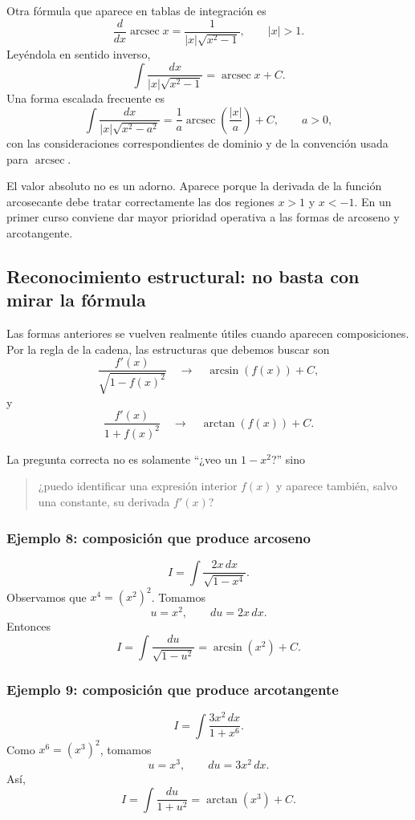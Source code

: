Otra fórmula que aparece en tablas de integración es
\[
\frac{d}{dx}\operatorname{arcsec}x
=\frac1{|x|\sqrt{x^2-1}},\qquad |x|>1.
\]
Leyéndola en sentido inverso,
\[
\boxed{\int\frac{dx}{|x|\sqrt{x^2-1}}
=\operatorname{arcsec}x+C.}
\]
Una forma escalada frecuente es
\[
\boxed{\int\frac{dx}{|x|\sqrt{x^2-a^2}}
=\frac1a\operatorname{arcsec}\left(\frac{|x|}{a}\right)+C,\qquad a>0,}
\]
con las consideraciones correspondientes de dominio y de la convención usada
para $\operatorname{arcsec}$.

\begin{advertencia}
El valor absoluto no es un adorno. Aparece porque la derivada de la función
arcosecante debe tratar correctamente las dos regiones $x>1$ y $x<-1$. En un
primer curso conviene dar mayor prioridad operativa a las formas de arcoseno
y arcotangente.
\end{advertencia}

\subsection{Reconocimiento estructural: no basta con mirar la fórmula}

Las formas anteriores se vuelven realmente útiles cuando aparecen
composiciones. Por la regla de la cadena, las estructuras que debemos buscar
son
\[
\boxed{\frac{f'(x)}{\sqrt{1-f(x)^2}}}
\quad\longrightarrow\quad
\arcsin(f(x))+C,
\]
y
\[
\boxed{\frac{f'(x)}{1+f(x)^2}}
\quad\longrightarrow\quad
\arctan(f(x))+C.
\]

La pregunta correcta no es solamente ``¿veo un $1-x^2$?'' sino
\begin{quote}
¿puedo identificar una expresión interior $f(x)$ y aparece también, salvo una
constante, su derivada $f'(x)$?
\end{quote}

\subsubsection*{Ejemplo 8: composición que produce arcoseno}
\[
I=\int\frac{2x\,dx}{\sqrt{1-x^4}}.
\]
Observamos que $x^4=(x^2)^2$. Tomamos
\[
u=x^2,\qquad du=2x\,dx.
\]
Entonces
\[
I=\int\frac{du}{\sqrt{1-u^2}}
=\boxed{\arcsin(x^2)+C}.
\]

\subsubsection*{Ejemplo 9: composición que produce arcotangente}
\[
I=\int\frac{3x^2\,dx}{1+x^6}.
\]
Como $x^6=(x^3)^2$, tomamos
\[
u=x^3,\qquad du=3x^2\,dx.
\]
Así,
\[
I=\int\frac{du}{1+u^2}
=\boxed{\arctan(x^3)+C}.
\]


